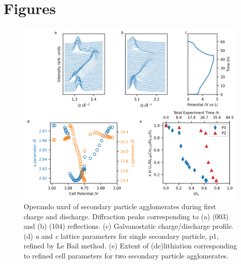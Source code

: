 \documentclass{article}
\begin{document}
\newpage
\section*{Figures}

\begin{figure}[!h]
  \includegraphics[width=\textwidth]{figures/NCA_xrd.png}
  \caption{Operando \gls{uxrd} of \nca{} secondary particle
    agglomerates during first charge and discharge. Diffraction peaks
    corresponding to (a) (003) and (b) (104) reflections. (c)
    Galvanostatic charge/discharge profile. (d) \textit{a} and
    \textit{c} lattice parameters for single secondary particle,
    \gls{p1}, refined by Le Bail method. (e) Extent of (de)lithiation
    corresponding to refined cell parameters\cite{robert2015} for two
    secondary particle agglomerates.}
  \label{fig:uxrd}
\end{figure}
\end{document}
